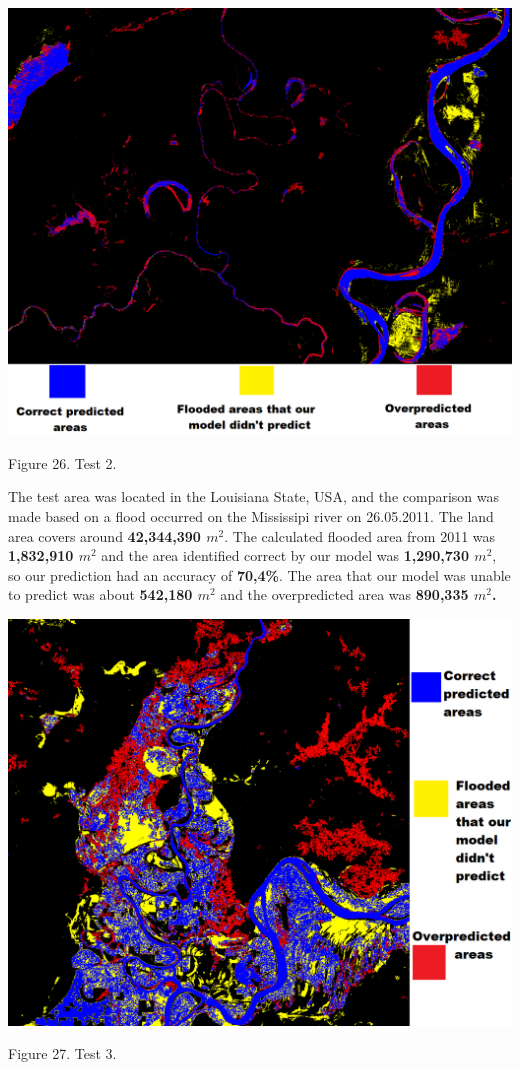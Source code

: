\documentclass[12pt, a4paper]{report}
\begin{document}
\bigskip
\includegraphics[scale=0.55, center]{test_2.png}
\begin{center}
Figure 26. Test 2.
\end{center}
\par 

The test area was located in the Louisiana State, USA, and the comparison was made based on a flood occurred on the Mississipi river on 26.05.2011. The land area covers around \textbf{42,344,390 $m^2$}. The calculated flooded area from 2011 was \textbf{1,832,910 $m^2$} and the area identified correct by our model was \textbf{1,290,730 $m^2$}, so our prediction had an accuracy of \textbf{70,4\%}. The area that our model was unable to predict was about \textbf{542,180 $m^2$} and the overpredicted area was \textbf{890,335 $m^2$.}

\newpage

\bigskip
\includegraphics[scale=0.6, center]{test_3.png}
\begin{center}
Figure 27. Test 3.
\end{center}
\par 
\end{document}
